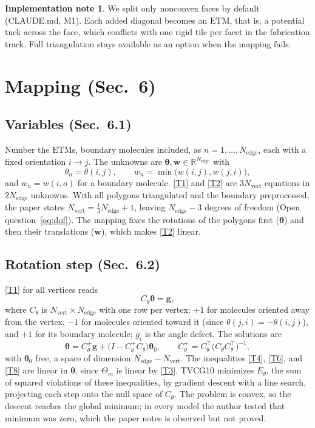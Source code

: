\documentclass[11pt]{article}
\theoremstyle{definition}
\newtheorem{impl}{Implementation note}
\newcommand{\ETM}{\mathrm{ETM}}
\newcommand{\tv}{\boldsymbol{\theta}}
\newcommand{\wv}{\mathbf{w}}
\newcommand{\Nv}{N_{\mathrm{vert}}}
\newcommand{\Ne}{N_{\mathrm{edge}}}
\begin{document}
\begin{impl}
We split only nonconvex faces by default (CLAUDE.md, M1). Each added diagonal
becomes an $\ETM$, that is, a potential tuck across the face, which conflicts
with one rigid tile per facet in the fabrication track. Full triangulation stays
available as an option when the mapping fails.
\end{impl}

\section{Mapping (Sec.~6)}

\subsection{Variables (Sec.~6.1)}

Number the $\ETM$s, boundary molecules included, as $n = 1, \dots, \Ne$, each
with a fixed orientation $i \to j$. The unknowns are $\tv, \wv \in \mathbb
R^{\Ne}$ with
\[
  \theta_n = \theta(i,j), \qquad w_n = \min\bigl(w(i,j), w(j,i)\bigr),
\]
and $w_n = w(i,o)$ for a boundary molecule. \eqref{T1} and \eqref{T2} are
$3\Nv$ equations in $2\Ne$ unknowns. With all polygons triangulated and the
boundary preprocessed, the paper states $\Nv = \frac13 \Ne + 1$, leaving
$\Ne - 3$ degrees of freedom (Open question~\ref{oq:dof}). The mapping fixes the
rotations of the polygons first ($\tv$) and then their translations ($\wv$),
which makes \eqref{T2} linear.

\subsection{Rotation step (Sec.~6.2)}

\eqref{T1} for all vertices reads
\begin{equation}
  C_\theta \tv = \mathbf g, \tag{T15}\label{T15}
\end{equation}
where $C_\theta$ is $\Nv \times \Ne$ with one row per vertex: $+1$ for
molecules oriented away from the vertex, $-1$ for molecules oriented toward it
(since $\theta(j,i) = -\theta(i,j)$), and $+1$ for its boundary molecule;
$g_i$ is the angle defect. The solutions are
\begin{equation}
  \tv = C_\theta^+ \mathbf g + \bigl(I - C_\theta^+ C_\theta\bigr)\tv_0,
  \qquad C_\theta^+ = C_\theta^\top \bigl(C_\theta C_\theta^\top\bigr)^{-1},
  \tag{T16}\label{T16}
\end{equation}
with $\tv_0$ free, a space of dimension $\Ne - \Nv$. The inequalities
\eqref{T4}, \eqref{T6}, and \eqref{T8} are linear in $\tv$, since $\Theta_m$ is
linear by \eqref{T3}. TVCG10 minimizes $E_\theta$, the sum of squared violations
of these inequalities, by gradient descent with a line search, projecting each
step onto the null space of $C_\theta$. The problem is convex, so the descent
reaches the global minimum; in every model the author tested that minimum was
zero, which the paper notes is observed but not proved.
\end{document}
